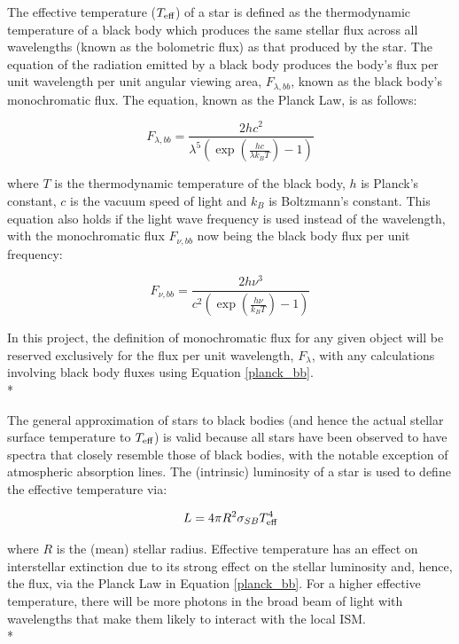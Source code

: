 \documentclass[12pt, a4paper]{report}
\begin{document}
The effective temperature ($T_{\textnormal{eff}}$) of a star is defined as the thermodynamic temperature of a black body which produces the same stellar flux across all wavelengths (known as the bolometric flux) as that produced by the star. The equation of the radiation emitted by a black body produces the body's flux per unit wavelength per unit angular viewing area, $F_{\lambda,bb}$, known as the black body's monochromatic flux. The equation, known as the Planck Law, is as follows:


\begin{equation}
F_{\lambda,bb} = \frac{2hc^{2}}{\lambda^{5}\left(\exp\left({\frac{hc}{\lambda k_{B}T}}\right) - 1\right)}
\label{planck_bb}
\end{equation} 

where $T$ is the thermodynamic temperature of the black body, $h$ is Planck's constant, $c$ is the vacuum speed of light and $k_{B}$ is Boltzmann's constant. This equation also holds if the light wave frequency is used instead of the wavelength, with the monochromatic flux $F_{\nu,bb}$ now being the black body flux per unit frequency:

\begin{equation}
F_{\nu,bb} = \frac{2h\nu^{3}}{c^{2}\left(\exp\left({\frac{h\nu}{k_{B}T}}\right) - 1\right)}
\label{planck_bb_freq}
\end{equation}

In this project, the definition of monochromatic flux for any given object will be reserved exclusively for the flux per unit wavelength, $F_{\lambda}$, with any calculations involving black body fluxes using Equation \ref{planck_bb}. \\*

The general approximation of stars to black bodies (and hence the actual stellar surface temperature to $T_{\textnormal{eff}}$) is valid because all stars have been observed to have spectra that closely resemble those of black bodies, with the notable exception of atmospheric absorption lines. The (intrinsic) luminosity of a star is used to define the effective temperature via:

\begin{equation}
L = 4 \pi R^{2} \sigma_{SB} T_{\textnormal{eff}}^{4}
\label{Teff_def}
\end{equation}

where $R$ is the (mean) stellar radius. Effective temperature has an effect on interstellar extinction due to its strong effect on the stellar luminosity and, hence, the flux, via the Planck Law in Equation \ref{planck_bb}. For a higher effective temperature, there will be more photons in the broad beam of light with wavelengths that make them likely to interact with the local ISM. \\*
\end{document}
